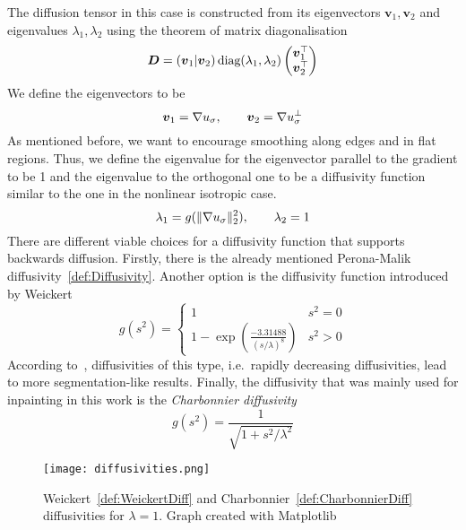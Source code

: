 The diffusion tensor in this case is constructed from its eigenvectors $\boldsymbol v_1,
\boldsymbol v_2$ and eigenvalues $\lambda_1, \lambda_2$ using the
theorem of matrix diagonalisation
\begin{equation}\label{eq:DiffTensor}
    \boldsymbol D = \left(\boldsymbol v_1\vert \boldsymbol v_2\right) \textnormal{diag}(\lambda_1, \lambda_2)
    \begin{pmatrix}
        \boldsymbol v_1^\top\\
        \boldsymbol v_2^\top
    \end{pmatrix}
\end{equation}
We define the eigenvectors to be
\begin{equation}
    \boldsymbol v_1 = \mathbf{\nabla} u_\sigma,\qquad\boldsymbol v_2 = \mathbf{\nabla} u_\sigma^\bot
\end{equation}
As mentioned before, we want to encourage smoothing along edges and in flat regions. Thus, we
define the eigenvalue for the eigenvector parallel to the gradient to be 1 and the eigenvalue to
the orthogonal one to be a diffusivity function similar to the one in the nonlinear isotropic case.
\begin{equation}
    \lambda_1 = g(\lVert\mathbf{\nabla} u_\sigma\rVert_2^2),\qquad\lambda_2 = 1
\end{equation}
There are different viable choices for a diffusivity function that supports backwards diffusion.
Firstly, there is the already mentioned Perona-Malik diffusivity~\eqref{def:Diffusivity}. Another
option is the diffusivity function introduced by Weickert\cite{weickert96}
\begin{equation}
    g(s^2) = \begin{cases}
        1 & s^2 = 0\\
        1 - \exp\left(\frac{-3.31488}{{(s/\lambda)}^8}\right) & s^2 > 0
    \end{cases}\label{def:WeickertDiff}
\end{equation}
According to~\cite{dic}, diffusivities of this type, i.e.\ rapidly decreasing diffusivities,
lead to more segmentation-like results.
Finally, the diffusivity that was mainly used for inpainting in this work is the
\textit{Charbonnier diffusivity}~\cite{charbonnier}
\begin{equation}
    g(s^2) = \frac{1}{\sqrt{1 + s^2 / \lambda^2}}\label{def:CharbonnierDiff}
\end{equation}
\begin{figure}[H]
    \centering
    \texttt{[image: diffusivities.png]}
    \caption{Weickert~\eqref{def:WeickertDiff} and Charbonnier~\eqref{def:CharbonnierDiff}
    diffusivities for $\lambda = 1$. Graph created with Matplotlib~\cite{matplotlib}}
\end{figure}
